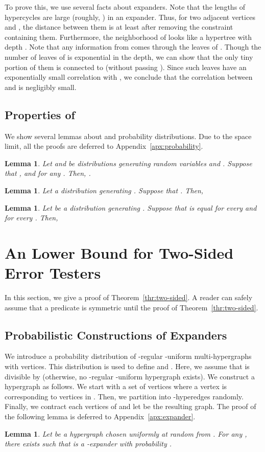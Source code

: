 \documentclass[letterpaper,11pt]{article}
\newtheorem{lemma}[theorem]{Lemma}
\begin{document}
To prove this, we use several facts about expanders.
Note that the lengths of hypercycles are large (roughly, ) in an expander.
Thus, for two adjacent vertices  and ,
the distance between them is at least  after removing the constraint containing them.
Furthermore, the neighborhood of  looks like a hypertree  with depth .
Note that any information from  comes through the leaves of .
Though the number of leaves of  is exponential in the depth, 
we can show that the only tiny portion of them is connected to  (without passing ).
Since such leaves have an exponentially small correlation with ,
we conclude that the correlation between  and  is negligibly small.


\subsection{Properties of }\label{subsec:probability}
We show several lemmas about  and probability distributions.
Due to the space limit, all the proofs are deferred to Appendix~\ref{apx:probability}.
\begin{lemma}\label{lmm:addition}
  Let  and  be distributions generating random variables  and .
  Suppose that , and  for any .
  Then, .
\end{lemma}
\begin{lemma}\label{lmm:serial}
  Let  a distribution generating .
  Suppose that .
  Then,
  
\end{lemma}
\begin{lemma}\label{lmm:product}
  Let  be a distribution generating .
  Suppose that  is equal for every  and  for every .
  Then,
  
\end{lemma}

\section{An  Lower Bound for Two-Sided Error Testers}\label{sec:two-sided}
In this section, 
we give a proof of Theorem~\ref{thr:two-sided}.
A reader can safely assume that a predicate  is symmetric until the proof of Theorem~\ref{thr:two-sided}.

\subsection{Probabilistic Constructions of Expanders}\label{sec:expander}
We introduce a probability distribution  of -regular -uniform multi-hypergraphs with  vertices.
This distribution is used to define  and .
Here, we assume that  is divisible by  (otherwise, no -regular -uniform hypergraph exists).
We construct a hypergraph  as follows.
We start with a set of  vertices  where a vertex  is corresponding to  vertices in .
Then, we partition  into -hyperedges randomly.
Finally, we contract each  vertices of  and let  be the resulting graph.
The proof of the following lemma is deferred to Appendix~\ref{apx:expander}.
\begin{lemma}\label{lmm:expander}
  Let  be a hypergraph chosen uniformly at random from .
  For any ,
  there exists  such that  is a -expander with probability .
\end{lemma}
\end{document}
